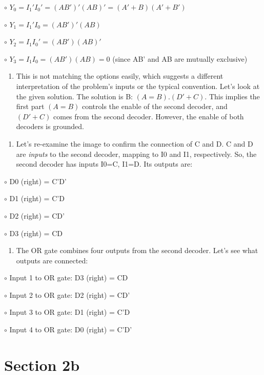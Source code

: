 \documentclass{article}
\begin{document}
\begin{itemize}
\begin{enumerate}
\end{enumerate}
    $\circ$ $Y_0 = I_1' I_0' = (AB')' (AB)' = (A'+B)(A'+B')$

    $\circ$ $Y_1 = I_1' I_0 = (AB')' (AB)$

    $\circ$ $Y_2 = I_1 I_0' = (AB') (AB)'$

    $\circ$ $Y_3 = I_1 I_0 = (AB') (AB) = 0$ (since AB' and AB are mutually exclusive)

\begin{enumerate}
\item This is not matching the options easily, which suggests a different interpretation of the problem's inputs or the typical convention. Let's look at the given solution. The solution is B: $(A=B).(D'+C)$. This implies the first part $(A=B)$ controls the enable of the second decoder, and $(D'+C)$ comes from the second decoder. However, the enable of both decoders is grounded.

\end{enumerate}
\begin{enumerate}
\item Let's re-examine the image to confirm the connection of C and D. C and D are \textit{inputs} to the second decoder, mapping to I0 and I1, respectively. So, the second decoder has inputs I0=C, I1=D. Its outputs are:

\end{enumerate}
    $\circ$ D0 (right) = C'D'

    $\circ$ D1 (right) = C'D

    $\circ$ D2 (right) = CD'

    $\circ$ D3 (right) = CD

\begin{enumerate}
\item The OR gate combines four outputs from the second decoder. Let's see what outputs are connected:

\end{enumerate}
    $\circ$ Input 1 to OR gate: D3 (right) = CD

    $\circ$ Input 2 to OR gate: D2 (right) = CD'

    $\circ$ Input 3 to OR gate: D1 (right) = C'D

    $\circ$ Input 4 to OR gate: D0 (right) = C'D'



\section{Section 2b}


\end{itemize}
\end{document}
